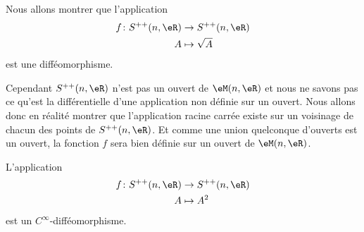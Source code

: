 \begin{normaltext}      \label{NomDJMUooTRUVkS}
    Nous allons montrer que l'application
    \begin{equation}
        \begin{aligned}
            f\colon S^{++}(n,\eR) & \to S^{++}(n,\eR)       \\
                          A       & \mapsto \sqrt{A}
        \end{aligned}
    \end{equation}
    est une difféomorphisme.

    Cependant \( S^{++}(n,\eR)\) n'est pas un ouvert de \( \eM(n,\eR)\) et nous ne savons pas ce qu'est la différentielle d'une application non définie sur un ouvert. Nous allons donc en réalité montrer que l'application racine carrée existe sur un voisinage de chacun des points de \( S^{++}(n,\eR)\). Et comme une union quelconque d'ouverts est un ouvert, la fonction \( f\) sera bien définie sur un ouvert de \( \eM(n,\eR)\).
\end{normaltext}

\begin{lemma}       \label{LemLBFOooDdNcgy}
    L'application
    \begin{equation}
        \begin{aligned}
            f\colon S^{++}(n,\eR) & \to S^{++}(n,\eR)       \\
                          A       & \mapsto A^2
        \end{aligned}
    \end{equation}
    est un \( C^{\infty}\)-difféomorphisme.
\end{lemma}

